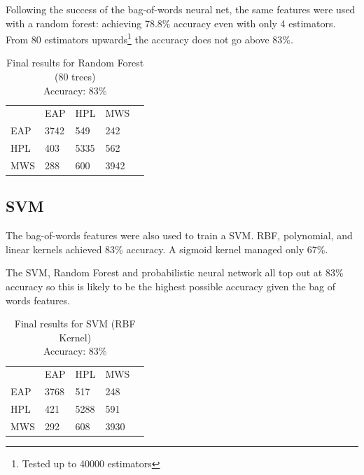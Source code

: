   Following the success of the bag-of-words neural net, the same features were
  used with a random forest: achieving 78.8\% accuracy even with only 4
  estimators. From 80 estimators upwards\footnote{Tested up to 40000 estimators}
  the accuracy does not go above 83\%.

  \begin{table}[h]
\centering
\begin{tabular}{m{1cm}|m{1cm}|m{1cm}|m{1cm}|m{0cm}}
\multicolumn{1}{m{1cm}}{} & \multicolumn{1}{m{1cm}}{EAP} & \multicolumn{1}{m{1cm}}{HPL} & \multicolumn{1}{m{1cm}}{MWS} &\\[5pt]
\cline{2-4}
EAP & 3742 & 549 & 242 & \\[5pt]
\cline{2-4}
HPL & 403 & 5335 & 562 & \\[5pt]
\cline{2-4}
MWS & 288 & 600 & 3942 & \\[5pt]
\cline{2-4}
\end{tabular}
\caption{Final results for Random Forest (80 trees)\\Accuracy: 83\% }
\label{tab:forest_res}
\end{table}

  \subsection{SVM}
  \label{sec:svm_extension}

  The bag-of-words features were also used to train a SVM. RBF, polynomial, and
  linear kernels achieved 83\% accuracy. A sigmoid kernel managed only 67\%.

  The SVM, Random Forest and probabilistic neural network all top out at 83\%
  accuracy so this is likely to be the highest possible accuracy given the bag
  of words features. 

    \begin{table}[h]
\centering
\begin{tabular}{m{1cm}|m{1cm}|m{1cm}|m{1cm}|m{0cm}}
\multicolumn{1}{m{1cm}}{} & \multicolumn{1}{m{1cm}}{EAP} & \multicolumn{1}{m{1cm}}{HPL} & \multicolumn{1}{m{1cm}}{MWS} &\\[5pt]
\cline{2-4}
EAP & 3768 & 517 & 248 & \\[5pt]
\cline{2-4}
HPL & 421 & 5288 & 591 & \\[5pt]
\cline{2-4}
MWS & 292 & 608 & 3930 & \\[5pt]
\cline{2-4}
\end{tabular}
\caption{Final results for SVM (RBF Kernel)\\Accuracy: 83\% }
\label{tab:forest_res}
\end{table}

